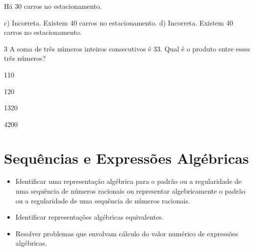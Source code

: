 {{{\begin{escolha}
{Há 30 carros no estacionamento.

c) Incorreta. Existem 40 carros no estacionamento. 
d) Incorreta. Existem 40 carros no estacionamento. 
}

\num{3} A soma de três números inteiros consecutivos é 33. Qual é o produto
entre esses três números?

\begin{escolha}
  \item 110

  \item 120

  \item 1320

  \item 4200
\end{escolha}


\pagestyle{mat}
\chapter{Sequências e Expressões Algébricas}


\begin{itemize}

  \item Identificar uma representação algébrica para o padrão ou a
regularidade de uma sequência de números racionais ou representar
algebricamente o padrão ou a regularidade de uma sequência de
números racionais. 
  \item Identificar representações algébricas equivalentes. 
  \item Resolver problemas que envolvam cálculo do valor numérico de
expressões algébricas. 

\end{itemize} 

\end{escolha}}}}

